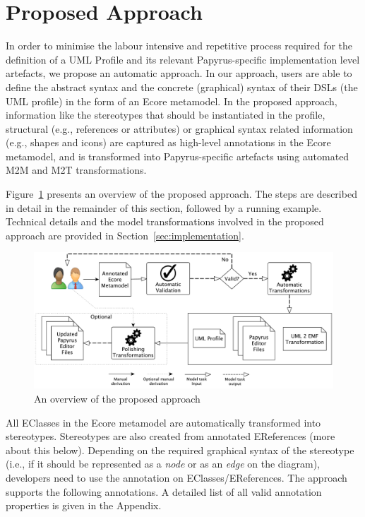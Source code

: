 \section{Proposed Approach}
\label{sec:approach}

In order to minimise the labour intensive and repetitive process required for the definition of a UML Profile and its relevant Papyrus-specific implementation level artefacts, we propose an automatic approach. 
In our approach, users are able to define the abstract syntax and the concrete (graphical) syntax of their DSLs (the UML profile) in the form of an Ecore metamodel.
In the proposed approach, information like the stereotypes that should be instantiated in the profile, structural (e.g., references or attributes) or graphical syntax related information (e.g., shapes and icons) are captured as high-level annotations in the Ecore metamodel, and is transformed into Papyrus-specific artefacts using automated M2M and M2T transformations. 

Figure~\ref{fig:approachOverview} presents an overview of the proposed approach. 
The steps are described in detail in the remainder of this section, followed by a running example. 
Technical details and the model transformations involved in the proposed approach are provided in Section~\ref{sec:implementation}.

\begin{figure}[t]
	\centering
	\includegraphics[width=1\textwidth]{diagrams/approachOverview.pdf}
	\caption[]{An overview of the proposed approach}
	\label{fig:approachOverview}
	\vspace{-6mm}
\end{figure}

All EClasses in the Ecore metamodel are automatically transformed into stereotypes. 
Stereotypes are also created from annotated EReferences (more about this below). 
Depending on the required graphical syntax of the stereotype (i.e., if it should be represented as a \textit{node} or as an \textit{edge} on the diagram), developers need to use the annotation on EClasses/EReferences. 
The approach supports the following annotations. 
A detailed list of all valid annotation properties is given in the Appendix. 

